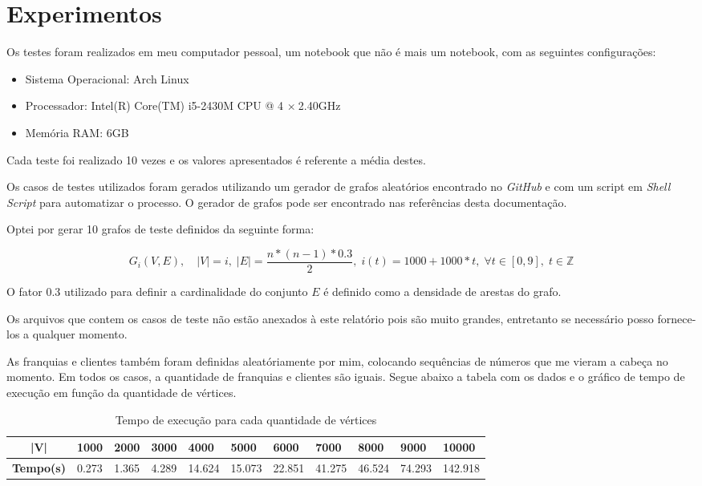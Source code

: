 \documentclass[
	12pt,
	a4paper,
	onepage,
	brazil
]{article}
\theoremstyle{definition}
\begin{document}
	\section{Experimentos}
	
	Os testes foram realizados em meu computador pessoal, um notebook que não é mais um notebook, com as seguintes configurações:
	
	\begin{itemize}
		\item Sistema Operacional: Arch Linux
		\item Processador: Intel(R) Core(TM) i5-2430M CPU @ 4 $\times \ $2.40GHz
		\item Memória RAM: 6GB
	\end{itemize}

	Cada teste foi realizado 10 vezes e os valores apresentados é referente a média destes.
	
	Os casos de testes utilizados foram gerados utilizando um gerador de grafos aleatórios encontrado no \textit{GitHub} e com um script em \textit{Shell Script} para automatizar o processo. O gerador de grafos pode ser encontrado nas referências desta documentação.
	
	Optei por gerar 10 grafos de teste definidos da seguinte forma:
	
	\begin{equation}
		G_i(V,E), \quad |V| = i,\; |E| = \frac{n*(n-1)*0.3}{2},\; i(t) = 1000 + 1000*t,\; \forall t \in [0,9],\; t \in \mathbb{Z}
	\end{equation}
	
	O fator 0.3 utilizado para definir a cardinalidade do conjunto $E$ é definido como a densidade de arestas do grafo.
	
	Os arquivos que contem os casos de teste não estão anexados à este relatório pois são muito grandes, entretanto se necessário posso fornece-los a qualquer momento.
	
	As franquias e clientes também foram definidas aleatóriamente por mim, colocando sequências de números que me vieram a cabeça no momento. Em todos os casos, a quantidade de franquias e clientes são iguais. Segue abaixo a tabela com os dados e o gráfico de tempo de execução em função da quantidade de vértices.
	
	\begin{table}[H]
		\centering
		\caption{Tempo de execução para cada quantidade de vértices}
		\label{my-label}
		\begin{tabular}{|c|l|l|l|l|l|l|l|l|l|l|}
			\hline
			\textbf{|V|}      & 1000  & 2000  & 3000  & 4000   & 5000   & 6000   & 7000   & 8000   & 9000   & 10000   \\ \hline
			\textbf{Tempo(s)} & 0.273 & 1.365 & 4.289 & 14.624 & 15.073 & 22.851 & 41.275 & 46.524 & 74.293 & 142.918 \\ \hline
		\end{tabular}
	\end{table}
	
\end{document}
